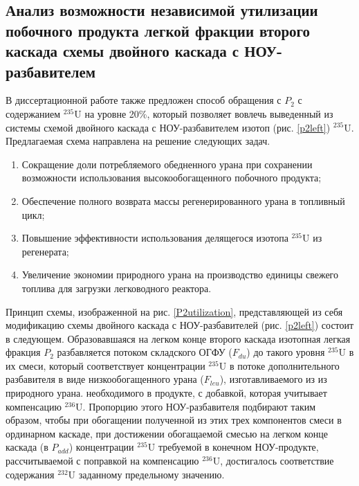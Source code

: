 \subsection{Анализ возможности независимой утилизации побочного продукта легкой фракции второго каскада схемы двойного каскада с НОУ-разбавителем}

В диссертационной работе также предложен способ обращения с $P_2$ с содержанием $^{235}$U на уровне 20\%, который позволяет вовлечь выведенный из системы схемой двойного каскада с НОУ-разбавителем изотоп (рис. \ref{p2left}) $^{235}$U. Предлагаемая схема направлена на решение следующих задач.

\begin{enumerate}
  \item Сокращение доли потребляемого обедненного урана при сохранении возможности использования высокообогащенного побочного продукта;
  \item Обеспечение полного возврата массы регенерированного урана в топливный цикл;
  \item Повышение эффективности использования делящегося изотопа $^{235}$U из регенерата;
  \item Увеличение экономии природного урана на производство единицы свежего топлива для загрузки легководного реактора.
\end{enumerate}

Принцип схемы, изображенной на рис. \ref{P2utilization}, представляющей из себя модификацию схемы двойного каскада с НОУ-разбавителей (рис. \ref{p2left}) состоит в следующем.
Образовавшаяся на легком конце второго каскада изотопная легкая фракция $P_2$  разбавляется потоком складского ОГФУ ($F_{du}$) до такого уровня $^{235}$U в их смеси, который соответствует концентрации $^{235}$U в потоке дополнительного разбавителя в виде низкообогащенного урана ($F_{leu}$), изготавливаемого из из природного урана. необходимого в продукте, с добавкой, которая учитывает компенсацию $^{236}$U. Пропорцию этого НОУ-разбавителя подбирают таким образом, чтобы при обогащении полученной из этих трех компонентов смеси в ординарном каскаде, при достижении обогащаемой смесью на легком конце каскада (в  $P_{add}$) концентрации $^{235}$U требуемой в конечном НОУ-продукте, рассчитываемой с поправкой на компенсацию $^{236}$U, достигалось соответствие содержания $^{232}$U заданному предельному значению.

